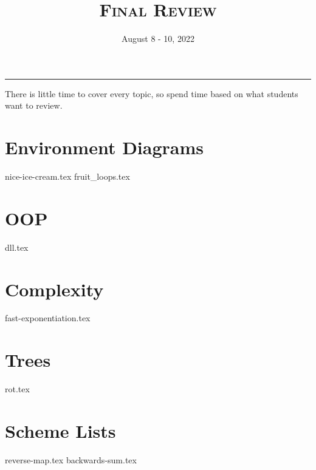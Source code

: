 \documentclass{exam}
\title{\textsc{Final Review}}
\date{August 8 - 10, 2022}
\begin{document}
\maketitle\rule{\textwidth}{0.15em}
\fontsize{12}{15}\selectfont

\begin{guide}
    There is little time to cover every topic, so spend time based on what students want to review.
\end{guide}

\section{Environment Diagrams}
\begin{questions}
{nice-ice-cream.tex}
{fruit_loops.tex}
\end{questions}
\newpage

\section{OOP}
\begin{questions}
{dll.tex}
\end{questions}
\newpage

\section{Complexity}
\begin{questions}
{fast-exponentiation.tex}
\end{questions}

\section{Trees}
\begin{questions}
{rot.tex}
\end{questions}

\section{Scheme Lists}
\begin{questions}
{reverse-map.tex}
{backwards-sum.tex}
\end{questions}
\end{document}
